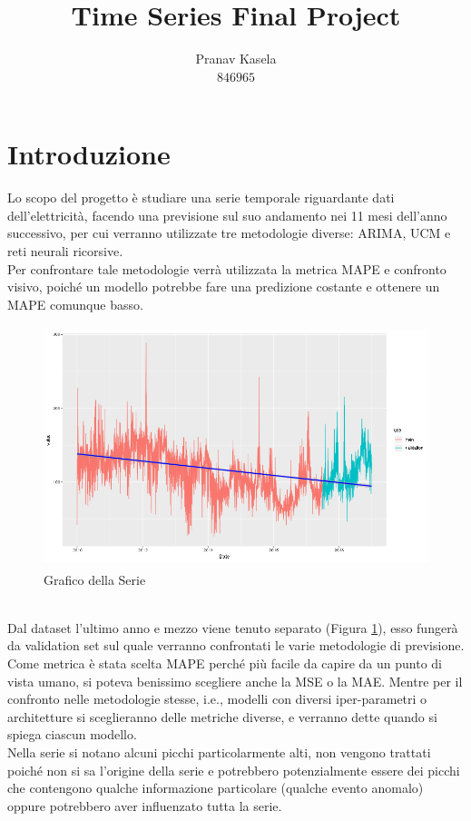 \documentclass[12pt, onecolumn]{article}
\title{Time Series Final Project}
\author{Pranav Kasela \\$846965$}
\date{}
\begin{document}
\maketitle

\section*{Introduzione}
Lo scopo del progetto è studiare una serie temporale riguardante dati dell'elettricità, facendo una previsione sul suo andamento nei 11 mesi dell'anno successivo, per cui verranno utilizzate tre metodologie diverse: ARIMA, UCM e reti neurali ricorsive.\\
Per confrontare tale metodologie verrà utilizzata la metrica MAPE e confronto visivo, poiché un modello potrebbe fare una predizione costante e ottenere un MAPE comunque basso.
\begin{figure}[!h]
  \centering
  \includegraphics[width=\linewidth, height=7cm]{imgs/Series.png}
  \caption{Grafico della Serie}
  \label{fig:series}
\end{figure}\\
Dal dataset l'ultimo anno e mezzo viene tenuto separato (Figura \ref{fig:series}), esso fungerà da validation set sul quale verranno confrontati le varie metodologie di previsione.
Come metrica è stata scelta MAPE perché più facile da capire da un punto di vista umano, si poteva benissimo scegliere anche la MSE o la MAE.
Mentre per il confronto nelle metodologie stesse, i.e., modelli con diversi iper-parametri o architetture si sceglieranno delle metriche diverse, e verranno dette quando si spiega ciascun modello.\\
Nella serie si notano alcuni picchi particolarmente alti, non vengono trattati poiché non si sa l'origine della serie e potrebbero potenzialmente essere dei picchi che contengono qualche informazione particolare (qualche evento anomalo) oppure potrebbero aver influenzato tutta la serie.
\end{document}
